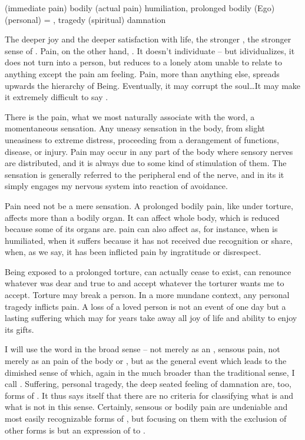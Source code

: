 {
{(immediate pain) bodily}
{(actual pain) humiliation, prolonged bodily (Ego)}
{(personal) = , tragedy}
{(spiritual) damnation}


\pa The deeper joy and the deeper satisfaction with life, the stronger
, the stronger sense of .  Pain, on
the other hand, .  It doesn't individuate -- but
idividualizes, it does not turn  into a person, but reduces
 to a lonely atom unable to relate to anything except the pain
 am feeling.  Pain, more than anything else, spreads upwards the
hierarchy of Being.  Eventually, it may corrupt the soul\ldots It may
make it extremely difficult to say \yes.

\pa \imm There is the  pain, what we most naturally
associate with the word, a momentaneous sensation.  Any uneasy
sensation in the body, from slight uneasiness to extreme distress, 
proceeding from a derangement of functions, disease, or
injury.  Pain may occur in
any part of the body where sensory nerves are distributed, and it is
always due to some kind of stimulation of them.  The sensation is
generally referred to the peripheral end of the nerve, and in its 
 it simply engages my nervous system into reaction of 
avoidance. 

\pa \act
Pain need not be a mere sensation. A prolonged bodily pain, like 
under torture, affects more than a bodily organ. It can affect  
whole body, which is reduced because some of its organs are. 
 pain 
can also affect  as, for instance, when  is humiliated, 
when it suffers because it has not received due recognition or 
share, when, as we say, it has been inflicted pain by ingratitude or 
disrespect.

\pa \mine
Being exposed to a prolonged torture,  can actually cease to 
exist,  can renounce whatever was dear and true to  and 
accept whatever the torturer wants me to accept. Torture may break a 
person. In a more mundane context, any personal tragedy inflicts 
pain. A loss of a loved person is not an event of one day but a 
lasting suffering which may for years take away all joy of life and 
ability to enjoy its gifts. 

\pa \inv

\pa I will use the word  in the broad sense -- not merely as an
, sensous pain, not merely as an  pain of the
body or , but as the general event which leads to the dimished
sense of  which, again in the much broader than the
traditional sense, I call .  Suffering, personal
tragedy, the deep seated feeling of damnation are, too, forms of
.  It thus says itself that there are no 
criteria for classifying what is and what is not  in this
sense.  Certainly, sensous or bodily pain are undeniable and most
easily recognizable forms of , but focusing on them with the
exclusion of other forms is but an expression of  to
.


}
